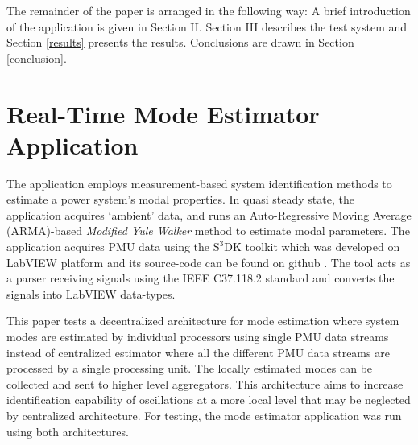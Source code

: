 \documentclass[conference]{IEEEtran}
\begin{document}
The remainder of the paper is arranged in the following way:  A brief introduction of the application is given in Section II.  Section III describes the test system and Section \ref{results} presents the results. Conclusions are drawn in Section \ref{conclusion}.

\section{Real-Time Mode Estimator Application}
The application employs measurement-based system identification methods to estimate a power system's modal properties. In quasi steady state, the application acquires `ambient' data, and runs an Auto-Regressive Moving Average (ARMA)-based \textit{Modified Yule Walker} method to estimate modal parameters. The application acquires PMU data using the $\mathrm{S^{3}}$DK toolkit which was developed on LabVIEW platform \cite{s3dk} and its source-code can be found on github \cite{git}.  The tool acts as a parser receiving signals using the IEEE C37.118.2 standard and converts the signals into LabVIEW data-types. 

This paper tests a decentralized architecture for mode estimation where system modes are estimated by individual processors using single PMU data streams instead of centralized estimator where all the different PMU data streams are processed by a single processing unit. The locally estimated modes can be collected and sent to higher level aggregators. This architecture aims to increase identification capability of oscillations at a more local level that may be neglected by centralized architecture. For testing, the mode estimator application was run using both architectures.
\end{document}
